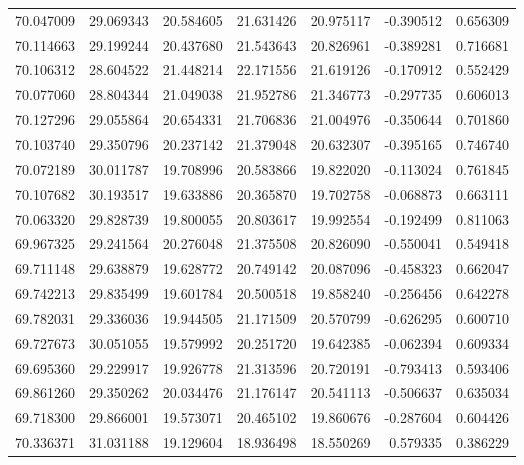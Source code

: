\begin{tabular}{rrrrrrr}
 70.047009 &  29.069343 &         20.584605 &         21.631426 &         20.975117 & -0.390512 &  0.656309 \\
 70.114663 &  29.199244 &         20.437680 &         21.543643 &         20.826961 & -0.389281 &  0.716681 \\
 70.106312 &  28.604522 &         21.448214 &         22.171556 &         21.619126 & -0.170912 &  0.552429 \\
 70.077060 &  28.804344 &         21.049038 &         21.952786 &         21.346773 & -0.297735 &  0.606013 \\
 70.127296 &  29.055864 &         20.654331 &         21.706836 &         21.004976 & -0.350644 &  0.701860 \\
 70.103740 &  29.350796 &         20.237142 &         21.379048 &         20.632307 & -0.395165 &  0.746740 \\
 70.072189 &  30.011787 &         19.708996 &         20.583866 &         19.822020 & -0.113024 &  0.761845 \\
 70.107682 &  30.193517 &         19.633886 &         20.365870 &         19.702758 & -0.068873 &  0.663111 \\
 70.063320 &  29.828739 &         19.800055 &         20.803617 &         19.992554 & -0.192499 &  0.811063 \\
 69.967325 &  29.241564 &         20.276048 &         21.375508 &         20.826090 & -0.550041 &  0.549418 \\
 69.711148 &  29.638879 &         19.628772 &         20.749142 &         20.087096 & -0.458323 &  0.662047 \\
 69.742213 &  29.835499 &         19.601784 &         20.500518 &         19.858240 & -0.256456 &  0.642278 \\
 69.782031 &  29.336036 &         19.944505 &         21.171509 &         20.570799 & -0.626295 &  0.600710 \\
 69.727673 &  30.051055 &         19.579992 &         20.251720 &         19.642385 & -0.062394 &  0.609334 \\
 69.695360 &  29.229917 &         19.926778 &         21.313596 &         20.720191 & -0.793413 &  0.593406 \\
 69.861260 &  29.350262 &         20.034476 &         21.176147 &         20.541113 & -0.506637 &  0.635034 \\
 69.718300 &  29.866001 &         19.573071 &         20.465102 &         19.860676 & -0.287604 &  0.604426 \\
 70.336371 &  31.031188 &         19.129604 &         18.936498 &         18.550269 &  0.579335 &  0.386229 \\

\end{tabular}
